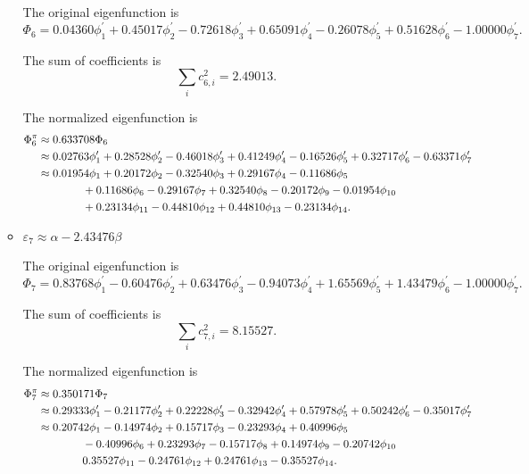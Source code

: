 \documentclass[a4paper]{book}
\begin{document}
\begin{solution}
\begin{enumerate}[label=(\alph*)]
\begin{itemize}
		The original eigenfunction is
		\begin{equation*}
			\Phi_6 = 0.04360 \phi^\prime_1 + 0.45017 \phi^\prime_2 -0.72618 \phi^\prime_3 +0.65091 \phi^\prime_4 -0.26078 \phi^\prime_5 + 0.51628 \phi^\prime_6 - 1.00000 \phi^\prime_7.
		\end{equation*}
		
		The sum of coefficients is
		\begin{equation*}
			\sum_{i} c^2_{6,i} = 2.49013.
		\end{equation*}
		
		The normalized eigenfunction is
		\begin{align}
			\Phi^\pi_6 &\approx 0.633708 \Phi_6 \notag \\
			&\approx 0.02763 \phi^\prime_1 + 0.28528 \phi^\prime_2 -0.46018 \phi^\prime_3 + 0.41249 \phi^\prime_4 - 0.16526 \phi^\prime_5 + 0.32717 \phi^\prime_6 - 0.63371 \phi^\prime_7 \notag \\
			&\approx 0.01954 \phi_1 +0.20172 \phi_2 - 0.32540 \phi_3 +0.29167 \phi_4 -0.11686 \phi_5  \notag \\
			&\hspace*{4em} +0.11686 \phi_6 -0.29167 \phi_7 + 0.32540\phi_8 -0.20172 \phi_9 - 0.01954 \phi_{10} \notag \\
			&\hspace*{4em} + 0.23134 \phi_{11} -0.44810 \phi_{12} +0.44810 \phi_{13} - 0.23134  \phi_{14} .
		\end{align}
		
		
		\item $\varepsilon_7 \approx \alpha -2.43476 \beta$
		
		The original eigenfunction is
		\begin{equation*}
			\Phi_7 = 0.83768 \phi^\prime_1 - 0.60476 \phi^\prime_2 +0.63476 \phi^\prime_3 - 0.94073 \phi^\prime_4 + 1.65569 \phi^\prime_5 + 1.43479 \phi^\prime_6 - 1.00000 \phi^\prime_7.
		\end{equation*}
		
		The sum of coefficients is
		\begin{equation*}
			\sum_{i} c^2_{7,i} = 8.15527.
		\end{equation*}
		
		The normalized eigenfunction is
		\begin{align}
			\Phi^\pi_7 &\approx 0.350171 \Phi_7 \notag \\
			&\approx 0.29333 \phi^\prime_1 - 0.21177 \phi^\prime_2 +0.22228 \phi^\prime_3 -0.32942 \phi^\prime_4 + 0.57978 \phi^\prime_5 + 0.50242 \phi^\prime_6 - 0.35017 \phi^\prime_7\\
			&\approx 0.20742 \phi_1 -0.14974 \phi_2 + 0.15717 \phi_3 -0.23293\phi_4 + 0.40996\phi_5  \notag \\
			&\hspace*{4em} -0.40996 \phi_6 +0.23293\phi_7 - 0.15717\phi_8 +0.14974 \phi_9 -0.20742 \phi_{10} \notag \\
			&\hspace*{4em} 0.35527 \phi_{11} -0.24761 \phi_{12} +0.24761 \phi_{13} -0.35527  \phi_{14} .
		\end{align}
		

\end{itemize}
\end{enumerate}
\end{solution}
\end{document}
